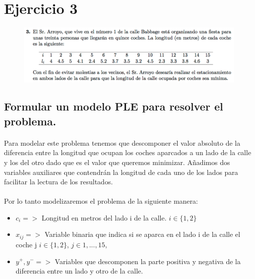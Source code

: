 \documentclass[10pt, a4paper]{article}
\begin{document}
	\section{Ejercicio 3}

        \begin{figure}[H]
        \centering
            \includegraphics[width=\textwidth]{res/exercise-3.png}
        \end{figure}


		\subsection{Formular un modelo PLE para resolver el problema.}

			\paragraph{}
			Para modelar este problema tenemos que descomponer el valor absoluto de la diferencia entre la longitud que ocupan los coches aparcados a un lado de la calle y los del otro dado que es el valor que queremos minimizar. Añadimos dos variables auxiliares que contendrán la longitud de cada uno de los lados para facilitar la lectura de los resultados.

			\paragraph{}
			Por lo tanto modelizaremos el problema de la siguiente manera:

			\begin{itemize}
				\item \(c_{i} => \) Longitud en metros del lado i de la calle. $i \in \{1,2\}$

				\item \(x_{ij} => \) Variable binaria que indica si se aparca en el lado i de la calle el coche j  $i \in \{1,2\}$, $j \in {1,...,15}$,

				\item \(y^{+}, y^{-} => \) Variables que descomponen la parte positiva y negativa de la diferencia entre un lado y otro de la calle.
			\end{itemize}
\end{document}
